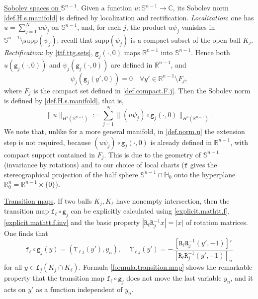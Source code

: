 \documentclass[10pt,reqno,a4paper]{article}
\numberwithin{equation}{section}
\theoremstyle{plain}
\theoremstyle{definition}
\newcommand{\R}{{\mathbb R}}
\newcommand{\C}{{\mathbb C}}
\renewcommand{\S}{{\mathbb S}}
\begin{document}
\underline{Sobolev spaces on $\S^{n-1}$}. 
Given a function $u : \S^{n-1} \to \C$, its Sobolev norm \eqref{def.H.s.manifold}
is defined by localization and rectification. 
\emph{Localization}: one has $u = \sum_{j=1}^N u \psi_j$ on $\S^{n-1}$, 
and, for each $j$, the product $u \psi_j$ vanishes in $\S^{n-1} \setminus \mathrm{supp}(\psi_j)$; 
recall that $\mathrm{supp}(\psi_j)$ is a compact subset of the open ball $K_j$. 
\emph{Rectification}: by \eqref{ttf.ttg.sets}, 
$\mathtt g_j(\cdot,0)$ maps $\R^{n-1}$ into $\S^{n-1}$. 
Hence both $u(\mathtt g_j(\cdot,0))$ and $\psi_j(\mathtt g_j(\cdot,0))$ are defined in $\R^{n-1}$, and 
\begin{equation} \label{psi.j.is.zero}
\psi_j(\mathtt g_j(y',0)) = 0 \quad \forall y' \in \R^{n-1} \setminus F_j,
\end{equation}
where $F_j$ is the compact set defined in \eqref{def.compact.F.j}.
Then the Sobolev norm is defined by \eqref{def.H.s.manifold}, that is, 
\begin{equation} \label{def.norm.u}
\| u \|_{H^s(\S^{n-1})} := \sum_{j=1}^N \| (u \psi_j) \circ \mathtt g_j(\cdot, 0) \|_{H^s(\R^{n-1})}. 
\end{equation}
We note that, unlike for a more general manifold, 
in \eqref{def.norm.u} the extension step is not required, 
because $(u \psi_j) \circ \mathtt g_j(\cdot, 0)$ is already defined in $\R^{n-1}$, 
with compact support contained in $F_j$. 
This is due to the geometry of $\S^{n-1}$ (invariance by rotations) 
and to our choice of local charts 
($\mathtt f$ gives the stereographical projection of the half sphere 
$\S^{n-1} \cap \mathbb H_0$ onto the hyperplane $\R^n_0 = \R^{n-1} \times \{0\}$).



\medskip

\underline{Transition maps}. 
If two balls $K_j, K_\ell$ have nonempty intersection, 
then the transition map $\mathtt f_\ell \circ \mathtt g_j$ 
can be explicitly calculated using \eqref{explicit.mathtt.f}, \eqref{explicit.mathtt.f.inv}
and the basic property $|\mathtt R_\ell \mathtt R_j^{-1} x| = |x|$ of rotation matrices. 
One finds that 
\begin{equation}  \label{formula.transition.map}
\mathtt f_\ell \circ \mathtt g_j(y) = (\mathtt T_{\ell j}(y') , y_n), 
\quad \ 
\mathtt T_{\ell j}(y') 
= - \frac{[\mathtt R_\ell \mathtt R_j^{-1} (y', -1)]'}{[\mathtt R_\ell \mathtt R_j^{-1} (y', -1)]_n}
\end{equation}
for all $y \in \mathtt f_j(K_j \cap K_\ell)$.
Formula \eqref{formula.transition.map} shows the remarkable property that 
the transition map $\mathtt f_\ell \circ \mathtt g_j$ does not move the last variable $y_n$, 
and it acts on $y'$ as a function independent of $y_n$. 
\end{document}

